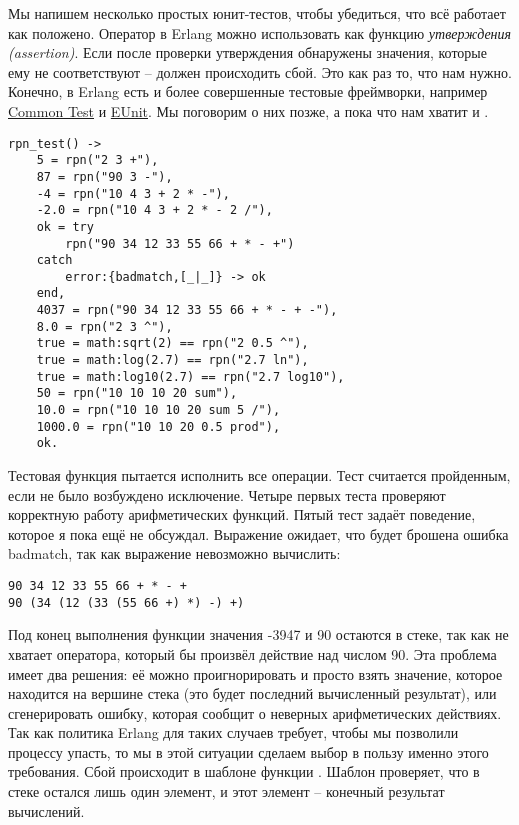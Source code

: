 Мы напишем несколько простых юнит\--тестов, чтобы убедиться, что всё работает как положено.
Оператор \ops{=\strut} в Erlang можно использовать как функцию \emph{утверждения (assertion)}.
Если после проверки утверждения обнаружены значения, которые ему не соответствуют \--- должен происходить сбой.
Это как раз то, что нам нужно.
Конечно, в Erlang есть и более совершенные тестовые фреймворки, например \href{http://erlang.org/doc/apps/common_test/write_test_chapter.html}{Common Test} и \href{http://erlang.org/doc/apps/eunit/chapter.html}{EUnit}.
Мы поговорим о них позже, а пока что нам хватит и \ops{=\strut}.
\begin{lstlisting}[style=erlang]
rpn_test() ->
    5 = rpn("2 3 +"),
    87 = rpn("90 3 -"),
    -4 = rpn("10 4 3 + 2 * -"),
    -2.0 = rpn("10 4 3 + 2 * - 2 /"),
    ok = try
        rpn("90 34 12 33 55 66 + * - +")
    catch
        error:{badmatch,[_|_]} -> ok
    end,
    4037 = rpn("90 34 12 33 55 66 + * - + -"),
    8.0 = rpn("2 3 ^"),
    true = math:sqrt(2) == rpn("2 0.5 ^"),
    true = math:log(2.7) == rpn("2.7 ln"),
    true = math:log10(2.7) == rpn("2.7 log10"),
    50 = rpn("10 10 10 20 sum"),
    10.0 = rpn("10 10 10 20 sum 5 /"),
    1000.0 = rpn("10 10 20 0.5 prod"),
    ok.
\end{lstlisting}

Тестовая функция пытается исполнить все операции.
Тест считается пройденным, если не было возбуждено исключение.
Четыре первых теста проверяют корректную работу арифметических функций.
Пятый тест задаёт поведение, которое я пока ещё не обсуждал.
Выражение  ожидает, что будет брошена ошибка badmatch, так как выражение невозможно вычислить:
\begin{lstlisting}[style=erlang]
90 34 12 33 55 66 + * - +
90 (34 (12 (33 (55 66 +) *) -) +)
\end{lstlisting}

Под конец выполнения функции  значения -3947 и 90 остаются в стеке, так как не хватает оператора, который бы произвёл действие над числом 90.
Эта проблема имеет два решения: её можно проигнорировать и просто взять значение, которое находится на вершине стека (это будет последний вычисленный результат), или сгенерировать ошибку, которая сообщит о неверных арифметических действиях.
Так как политика Erlang для таких случаев требует, чтобы мы позволили процессу упасть, то мы в этой ситуации сделаем выбор в пользу именно этого требования.
Сбой происходит в шаблоне \ops{[Res]} функции .
Шаблон проверяет, что в стеке остался лишь один элемент, и этот элемент \--- конечный результат вычислений.

